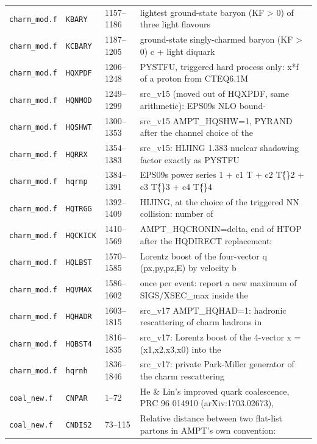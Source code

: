 {\begin{longtable}{@{}p{1.9cm}p{2.0cm}p{1.6cm}p{9.4cm}@{}}
\texttt{charm\_mod.f} & \texttt{KBARY} & 1157--1186 & lightest ground-state baryon (KF > 0) of three light flavours \\
\texttt{charm\_mod.f} & \texttt{KCBARY} & 1187--1205 & ground-state singly-charmed baryon (KF > 0) c + light diquark \\
\texttt{charm\_mod.f} & \texttt{HQXPDF} & 1206--1248 & PYSTFU, triggered hard process only: x*f of a proton from CTEQ6.1M \\
\texttt{charm\_mod.f} & \texttt{HQNMOD} & 1249--1299 & src\_\allowbreak{}v15 (moved out of HQXPDF, same arithmetic): EPS09s NLO bound- \\
\texttt{charm\_mod.f} & \texttt{HQSHWT} & 1300--1353 & src\_\allowbreak{}v15 AMPT\_\allowbreak{}HQSHW=1, PYRAND after the channel choice of the \\
\texttt{charm\_mod.f} & \texttt{HQRRX} & 1354--1383 & src\_\allowbreak{}v15: HIJING 1.383 nuclear shadowing factor exactly as PYSTFU \\
\texttt{charm\_mod.f} & \texttt{hqrnp} & 1384--1391 & EPS09s power series 1 + c1 T + c2 T\^\{\}2 + c3 T\^\{\}3 + c4 T\^\{\}4 \\
\texttt{charm\_mod.f} & \texttt{HQTRGG} & 1392--1409 & HIJING, at the choice of the triggered NN collision: number of \\
\texttt{charm\_mod.f} & \texttt{HQCKICK} & 1410--1569 & AMPT\_\allowbreak{}HQCRONIN=delta, end of HTOP after the HQDIRECT replacement: \\
\texttt{charm\_mod.f} & \texttt{HQLBST} & 1570--1585 & Lorentz boost of the four-vector q (px,py,pz,E) by velocity b \\
\texttt{charm\_mod.f} & \texttt{HQVMAX} & 1586--1602 & once per event: report a new maximum of SIGS/XSEC\_\allowbreak{}max inside the \\
\texttt{charm\_mod.f} & \texttt{HQHADR} & 1603--1815 & src\_\allowbreak{}v17 AMPT\_\allowbreak{}HQHAD=1: hadronic rescattering of charm hadrons in \\
\texttt{charm\_mod.f} & \texttt{HQBST4} & 1816--1835 & src\_\allowbreak{}v17: Lorentz boost of the 4-vector x = (x1,x2,x3,x0) into the \\
\texttt{charm\_mod.f} & \texttt{hqrnh} & 1836--1846 & src\_\allowbreak{}v17: private Park-Miller generator of the charm rescattering \\
\texttt{coal\_new.f} & \texttt{CNPAR} & 1--72 & He \& Lin's improved quark coalescence, PRC 96 014910 (arXiv:1703.02673), \\
\texttt{coal\_new.f} & \texttt{CNDIS2} & 73--115 & Relative distance between two flat-list partons in AMPT's own convention: \\

\end{longtable}}
